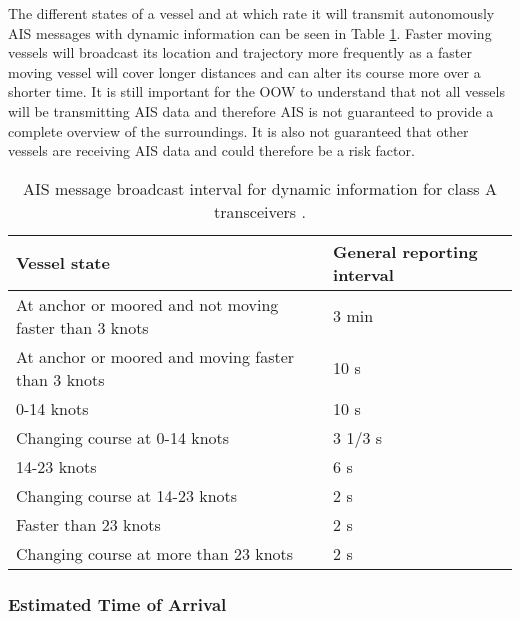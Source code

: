 \documentclass[../main.tex]{subfiles}
\begin{document}
The different states of a vessel and at which rate it will transmit autonomously AIS messages with dynamic information can be seen in Table \ref{tab:ais-rates}. Faster moving vessels will broadcast its location and trajectory more frequently as a faster moving vessel will cover longer distances and can alter its course more over a shorter time. It is still important for the OOW to understand that not all vessels will be transmitting AIS data and therefore AIS is not guaranteed to provide a complete overview of the surroundings. It is also not guaranteed that other vessels are receiving AIS data and could therefore be a risk factor. 

\begin{table}[H]
\centering
\begin{tabular}{|m{7cm}|m{4cm}|}
\hline
\rowcolor[HTML]{C0C0C0} 
\textbf{Vessel state}                                  & \textbf{General reporting interval} \\ \hline
At anchor or moored and not moving faster than 3 knots & 3 min                               \\ \hline
At anchor or moored and moving faster than 3 knots     & 10 s                                \\ \hline
0-14 knots                                             & 10 s                                \\ \hline
Changing course at 0-14 knots                          & 3 1/3 s                             \\ \hline
14-23 knots                                            & 6 s                                 \\ \hline
Changing course at 14-23 knots                         & 2 s                                 \\ \hline
Faster than 23 knots                                   & 2 s                                 \\ \hline
Changing course at more than 23 knots                  & 2 s                                 \\ \hline
\end{tabular}
\caption{AIS message broadcast interval for dynamic information for class A transceivers \cite{IMO_2015}.}
\label{tab:ais-rates}
\end{table}


\subsubsection{Estimated Time of Arrival}
\end{document}
